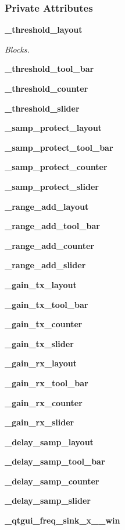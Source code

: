 \subsubsection*{Private Attributes}
\begin{DoxyCompactItemize}
\item 
{\bf \+\_\+threshold\+\_\+layout}
\begin{DoxyCompactList}\small\item\em Blocks. \end{DoxyCompactList}\item 
{\bf \+\_\+threshold\+\_\+tool\+\_\+bar}
\item 
{\bf \+\_\+threshold\+\_\+counter}
\item 
{\bf \+\_\+threshold\+\_\+slider}
\item 
{\bf \+\_\+samp\+\_\+protect\+\_\+layout}
\item 
{\bf \+\_\+samp\+\_\+protect\+\_\+tool\+\_\+bar}
\item 
{\bf \+\_\+samp\+\_\+protect\+\_\+counter}
\item 
{\bf \+\_\+samp\+\_\+protect\+\_\+slider}
\item 
{\bf \+\_\+range\+\_\+add\+\_\+layout}
\item 
{\bf \+\_\+range\+\_\+add\+\_\+tool\+\_\+bar}
\item 
{\bf \+\_\+range\+\_\+add\+\_\+counter}
\item 
{\bf \+\_\+range\+\_\+add\+\_\+slider}
\item 
{\bf \+\_\+gain\+\_\+tx\+\_\+layout}
\item 
{\bf \+\_\+gain\+\_\+tx\+\_\+tool\+\_\+bar}
\item 
{\bf \+\_\+gain\+\_\+tx\+\_\+counter}
\item 
{\bf \+\_\+gain\+\_\+tx\+\_\+slider}
\item 
{\bf \+\_\+gain\+\_\+rx\+\_\+layout}
\item 
{\bf \+\_\+gain\+\_\+rx\+\_\+tool\+\_\+bar}
\item 
{\bf \+\_\+gain\+\_\+rx\+\_\+counter}
\item 
{\bf \+\_\+gain\+\_\+rx\+\_\+slider}
\item 
{\bf \+\_\+delay\+\_\+samp\+\_\+layout}
\item 
{\bf \+\_\+delay\+\_\+samp\+\_\+tool\+\_\+bar}
\item 
{\bf \+\_\+delay\+\_\+samp\+\_\+counter}
\item 
{\bf \+\_\+delay\+\_\+samp\+\_\+slider}
\item 
{\bf \+\_\+qtgui\+\_\+freq\+\_\+sink\+\_\+x\+\_\+\_\+win}
\end{DoxyCompactItemize}


